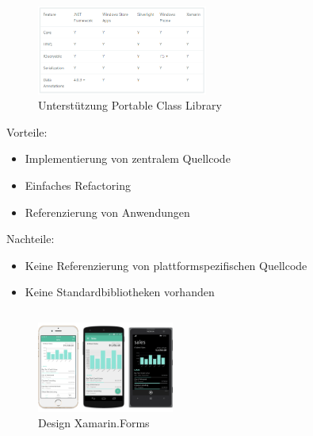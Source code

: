 \begin{figure}
	\begin{center}
		\includegraphics[width=0.5\textwidth]{images/technische_grundlagen/pclSupport.png}
		\caption{Unterstützung Portable Class Library \cite{Xamarin.PortableClass}}
	\end{center}
	\label{fig:pcl_support}
\end{figure}

\noindent
Vorteile:
\begin{itemize}
	\item Implementierung von zentralem Quellcode
	\item Einfaches Refactoring
	\item Referenzierung von Anwendungen
\end{itemize}
\noindent
Nachteile:
\begin{itemize}
	\item Keine Referenzierung von plattformspezifischen Quellcode
	\item Keine Standardbibliotheken vorhanden
\end{itemize}

\begin{verbatim}
\end{verbatim}

\newpage

\begin{figure}
	\begin{center}
		\includegraphics[width=0.4\textwidth]{images/technische_grundlagen/forms.png}
	\end{center}	
	\caption{Design Xamarin.Forms \cite{Xamarin.Builda}}
	\label{fig:forms}
\end{figure}

